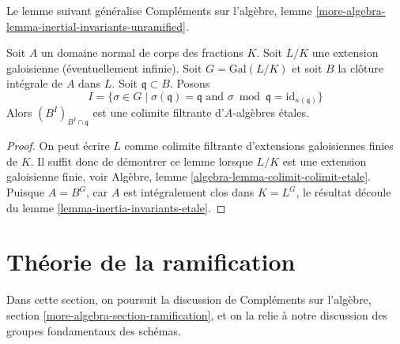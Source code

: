 \noindent
Le lemme suivant généralise
Compléments sur l'algèbre, lemme \ref{more-algebra-lemma-inertial-invariants-unramified}.

\begin{lemma}
\label{lemma-inertial-invariants-unramified}
Soit $A$ un domaine normal de corps des fractions $K$.
Soit $L/K$ une extension galoisienne (éventuellement infinie).
Soit $G = \text{Gal}(L/K)$ et soit
$B$ la clôture intégrale de $A$ dans $L$.
Soit $\mathfrak q \subset B$. Posons
$$
I = \{\sigma \in G \mid
\sigma(\mathfrak q) = \mathfrak q \text{ and }
\sigma \bmod \mathfrak q = \text{id}_{\kappa(\mathfrak q)}\}
$$
Alors $(B^I)_{B^I \cap \mathfrak q}$ est une colimite filtrante
d'$A$-algèbres étales.
\end{lemma}

\begin{proof}
On peut écrire $L$ comme colimite filtrante d'extensions galoisiennes finies
de $K$. Il suffit donc de démontrer ce lemme lorsque $L/K$ est
une extension galoisienne finie, voir
Algèbre, lemme \ref{algebra-lemma-colimit-colimit-etale}.
Puisque $A = B^G$, car $A$ est intégralement
clos dans $K = L^G$, le résultat découle du
lemme \ref{lemma-inertia-invariants-etale}.
\end{proof}







\section{Théorie de la ramification}
\label{section-ramification}

\noindent
Dans cette section, on poursuit la discussion de
Compléments sur l'algèbre, section \ref{more-algebra-section-ramification},
et on la relie à notre discussion des groupes fondamentaux des schémas.

